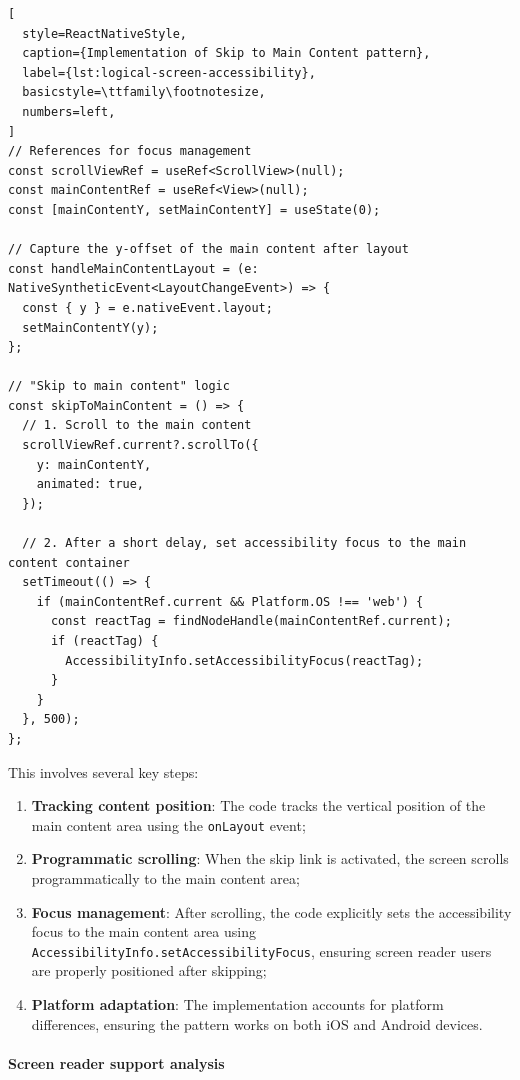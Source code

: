 \begin{lstlisting}[
  style=ReactNativeStyle,
  caption={Implementation of Skip to Main Content pattern},
  label={lst:logical-screen-accessibility},
  basicstyle=\ttfamily\footnotesize,
  numbers=left,
]
// References for focus management
const scrollViewRef = useRef<ScrollView>(null);
const mainContentRef = useRef<View>(null);
const [mainContentY, setMainContentY] = useState(0);

// Capture the y-offset of the main content after layout
const handleMainContentLayout = (e: NativeSyntheticEvent<LayoutChangeEvent>) => {
  const { y } = e.nativeEvent.layout;
  setMainContentY(y);
};

// "Skip to main content" logic
const skipToMainContent = () => {
  // 1. Scroll to the main content
  scrollViewRef.current?.scrollTo({
    y: mainContentY,
    animated: true,
  });

  // 2. After a short delay, set accessibility focus to the main content container
  setTimeout(() => {
    if (mainContentRef.current && Platform.OS !== 'web') {
      const reactTag = findNodeHandle(mainContentRef.current);
      if (reactTag) {
        AccessibilityInfo.setAccessibilityFocus(reactTag);
      }
    }
  }, 500);
};
\end{lstlisting}
\FloatBarrier

This involves several key steps:

\begin{enumerate}
    \item \textbf{Tracking content position}: The code tracks the vertical position of the main content area using the \texttt{onLayout} event;
    
    \item \textbf{Programmatic scrolling}: When the skip link is activated, the screen scrolls programmatically to the main content area;
    
    \item \textbf{Focus management}: After scrolling, the code explicitly sets the accessibility focus to the main content area using \texttt{AccessibilityInfo.setAccessibilityFocus}, ensuring screen reader users are properly positioned after skipping;
    
    \item \textbf{Platform adaptation}: The implementation accounts for platform differences, ensuring the pattern works on both iOS and Android devices.
\end{enumerate}

\paragraph{Screen reader support analysis}

